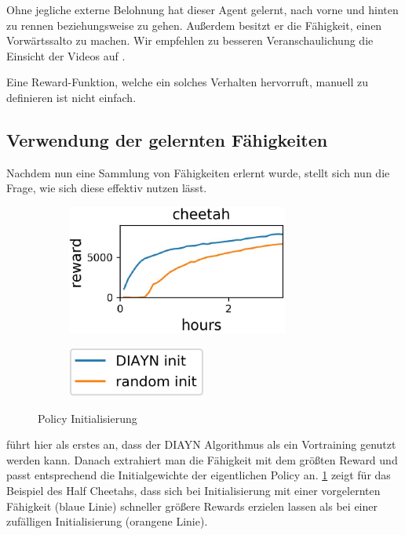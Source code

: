 Ohne jegliche externe Belohnung hat dieser Agent gelernt, nach vorne und hinten zu rennen beziehungsweise zu gehen. Außerdem besitzt er die Fähigkeit, einen Vorwärtssalto zu machen. Wir empfehlen zu besseren Veranschaulichung die Einsicht der Videos auf \cite{diversity_web}.

Eine Reward-Funktion, welche ein solches Verhalten hervorruft, manuell zu definieren ist nicht einfach.

\subsection{Verwendung der gelernten Fähigkeiten}
\label{sec:diversityusage}
Nachdem nun eine Sammlung von Fähigkeiten erlernt wurde, stellt sich nun die Frage, wie sich diese effektiv nutzen lässt.

\smallspace

\begin{figure}[h]
\begin{subfigure}{0.6\textwidth}
\includegraphics[width=0.8\textwidth, keepaspectratio=true, right]{images/cheetah_rewards.JPG}
\end{subfigure}
\begin{subfigure}{0.4\textwidth}
\includegraphics[width=0.5\textwidth, keepaspectratio=true, left]{images/cheetah_rewards_exp.JPG}
\end{subfigure}
\caption{Policy Initialisierung} \label{img:cheetah_rewards}
\end{figure}

\cite{diversity_eysenbach} führt hier als erstes an, dass der DIAYN Algorithmus als ein Vortraining genutzt werden kann. Danach extrahiert man die Fähigkeit mit dem größten Reward und passt entsprechend die Initialgewichte der eigentlichen Policy an. \ref{img:cheetah_rewards} zeigt für das Beispiel des Half Cheetahs, dass sich bei Initialisierung mit einer vorgelernten Fähigkeit (blaue Linie) schneller größere Rewards erzielen lassen als bei einer zufälligen Initialisierung (orangene Linie).

